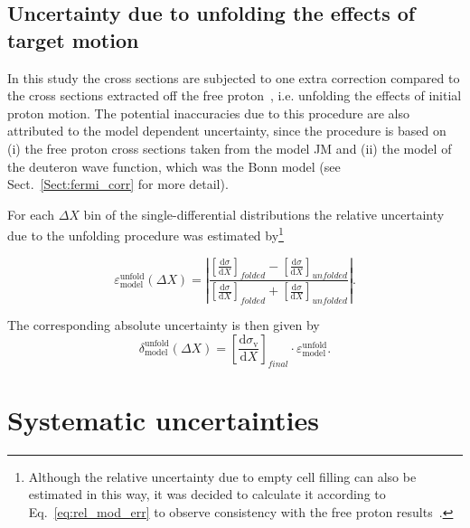 \subsection{Uncertainty due to unfolding the effects of target motion}
\label{Sect:mod_dep2}

In this study the cross sections are subjected to one extra correction compared to the cross sections extracted off the free proton~\cite{Rip_an_note:2002,Ripani:2002ss,Fed_an_note:2007,Fedotov:2008aa,Isupov:2017lnd,Arjun,Fed_an_note:2017,Fed_paper_2018}, i.e. unfolding the effects of initial proton motion. The potential inaccuracies due to this procedure are also attributed to the model dependent uncertainty, since the procedure is based on (i) the free proton cross sections taken from the model JM and (ii) the model of the deuteron wave function, which was the Bonn model (see Sect.~\ref{Sect:fermi_corr} for more detail). 

For each $\Delta X$ bin of the single-differential distributions the relative uncertainty due to the unfolding procedure was estimated by\footnote[5]{Although the relative uncertainty due to empty cell filling can also be estimated in this way, it was decided to calculate it according to Eq.~\eqref{eq:rel_mod_err} to observe consistency with the free proton results~\cite{Fed_an_note:2017}.}

\begin{equation}
\varepsilon^{\text{unfold}}_{\text{model}} (\Delta X) = \left |\dfrac{\left [ \frac{\textrm{d}\sigma}{\textrm{d}X} \right ]_{folded} - \left [ \frac{\textrm{d}\sigma}{\textrm{d}X} \right ]_{unfolded}}{\left [ \frac{\textrm{d}\sigma}{\textrm{d}X} \right ]_{folded} + \left [ \frac{\textrm{d}\sigma}{\textrm{d}X} \right ]_{unfolded}} \right |.
\label{eq:rel_mod_err_fermi}
\end{equation}

The corresponding absolute uncertainty is then given by
\begin{equation}
\delta^{\text{unfold}}_{\text{model}} (\Delta X) = \left [ \frac{\textrm{d}\sigma_{\text{v}}}{\textrm{d}X} \right ]_{final}\!\! \cdot \varepsilon^{\text{unfold}}_{\text{model}}.
\label{eq:error_stat_mod_fermi}
\end{equation}



\section{Systematic uncertainties}
\label{Sect:sys_uncert}

